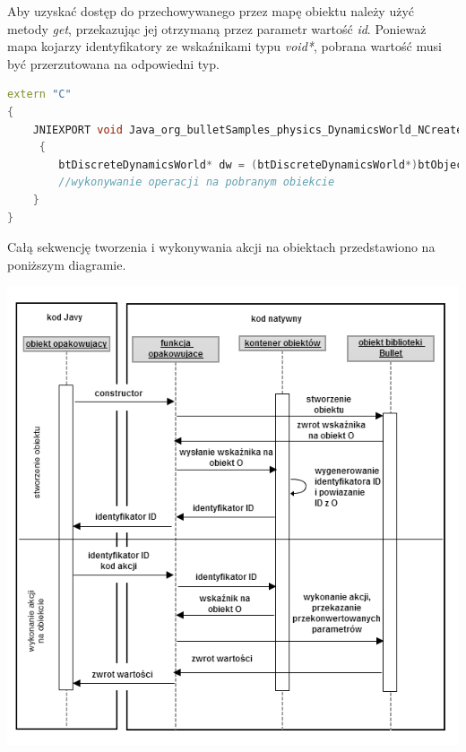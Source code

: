 Aby uzyskać dostęp do przechowywanego przez mapę obiektu należy użyć metody
\emph{get}, przekazując jej otrzymaną przez parametr wartość \emph{id}. Ponieważ
mapa kojarzy identyfikatory ze wskaźnikami typu \emph{void*}, pobrana wartość
musi być przerzutowana na odpowiedni typ.

\begin{lstlisting}[language=c++, caption=Pobranie przechowywanego obiektu z
mapy] extern "C"
{
	JNIEXPORT void Java_org_bulletSamples_physics_DynamicsWorld_NCreateBox( JNIEnv* env, jobject self, jint id ...) 
	 {
	 	btDiscreteDynamicsWorld* dw = (btDiscreteDynamicsWorld*)btObjects::get(id);
	 	//wykonywanie operacji na pobranym obiekcie
	}
}
\end{lstlisting}

Całą sekwencję tworzenia i wykonywania akcji na obiektach przedstawiono na
poniższym diagramie.

\begin{center}
\includegraphics[width=\textwidth]{./img/sequenceDiagram.png}
\end{center}

